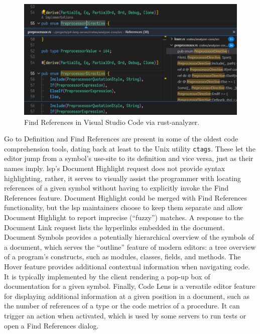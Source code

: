 \begin{figure}[h]
	\includegraphics[width=1.00\textwidth]{resources/code_find_references.png}
	\caption{Find References in Visual Studio Code via rust-analyzer.}
\end{figure}

Go to Definition and Find References are
present in some of the oldest code comprehension tools, dating back at least to
the Unix utility \texttt{ctags}\cite{exuberant_ctags}. These let the editor jump
from a symbol's use-site to its definition and vice versa, just as their names
imply. \acrshort{lsp}'s Document Highlight request does not provide syntax
highlighting, rather, it serves to visually assist the programmer with locating
references of a given symbol without having to explicitly invoke the Find
References feature. Document Highlight could be merged with Find References
functionality, but the \acrshort{lsp} maintainers choose to keep them separate
and allow Document Highlight to report imprecise (``fuzzy'') matches. A response
to the Document Link request lists the hyperlinks embedded in the document.
Document Symbols provides a potentially hierarchical overview of the symbols of
a document, which serves the ``outline'' feature of modern editors: a tree
overview of a program's constructs, such as modules, classes, fields, and
methods. The Hover feature provides additional contextual information when
navigating code. It is typically implemented by the client rendering a pop-up
box of documentation for a given symbol. Finally, Code Lens is a versatile
editor feature for displaying additional information at a given position in a
document, such as the number of references of a type or the code metrics of a
procedure\cite{codelens_comparison}. It can trigger an action when activated,
which is used by some servers to run tests or open a Find References dialog.

